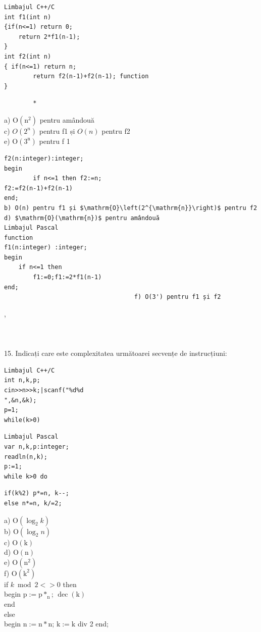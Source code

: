 \documentclass[10pt]{article}
\begin{document}
\begin{verbatim}
Limbajul C++/C
int f1(int n)
{if(n<=1) return 0;
    return 2*f1(n-1);
}
int f2(int n)
{ if(n<=1) return n;
        return f2(n-1)+f2(n-1); function
}
\end{verbatim}

\begin{verbatim}
        *
\end{verbatim}

a) $\mathrm{O}\left(\mathrm{n}^{2}\right)$ pentru amândouă\\
c) $O\left(2^{n}\right)$ pentru f1 și $O(n)$ pentru f2\\
e) $\mathrm{O}\left(3^{\mathrm{n}}\right)$ pentru f 1

\begin{verbatim}
f2(n:integer):integer;
begin
        if n<=1 then f2:=n;
f2:=f2(n-1)+f2(n-1)
end;
b) O(n) pentru f1 și $\mathrm{O}\left(2^{\mathrm{n}}\right)$ pentru f2
d) $\mathrm{O}(\mathrm{n})$ pentru amândouă
Limbajul Pascal
function
f1(n:integer) :integer;
begin
    if n<=1 then
        f1:=0;f1:=2*f1(n-1)
end;
                                    f) O(3') pentru f1 și f2
\end{verbatim}

,\\
$\qquad$\\
$\qquad$\\
$\qquad$\\
15. Indicați care este complexitatea următoarei secvențe de instrucțiuni:

\begin{verbatim}
Limbajul C++/C
int n,k,p;
cin>>n>>k;|scanf("%d%d
",&n,&k);
p=1;
while(k>0)
\end{verbatim}

\begin{verbatim}
Limbajul Pascal
var n,k,p:integer;
readln(n,k);
p:=1;
while k>0 do
\end{verbatim}

\begin{verbatim}
if(k%2) p*=n, k--;
else n*=n, k/=2;
\end{verbatim}

a) $\mathrm{O}\left(\log _{2} k\right)$\\
b) $\mathrm{O}\left(\log _{2} n\right)$\\
c) $\mathrm{O}(\mathrm{k})$\\
d) $\mathrm{O}(\mathrm{n})$\\
e) $\mathrm{O}\left(\mathrm{n}^{2}\right)$\\
f) $\mathrm{O}\left(\mathrm{k}^{2}\right)$\\
if $k \bmod 2<>0$ then\\
begin $\mathrm{p}:=\mathrm{p} *_{\mathrm{n}}$; $\operatorname{dec}(\mathrm{k})$\\
end\\
else\\
begin $\mathrm{n}:=\mathrm{n} * \mathrm{n}$; $\mathrm{k}:=\mathrm{k}$ div 2 end;
\end{document}
